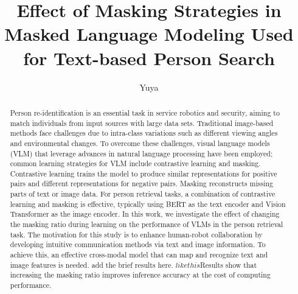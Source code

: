 \documentclass[mscthesis,english,oneside,biblatex,imlex]{template/uefcsthesis}
\title{Effect of Masking Strategies in Masked Language Modeling Used for Text-based Person Search} %
\author{Yuya}{Takagi} %
\date{\thismonth} %
\begin{document}
\maketitle

\begin{abstract}
Person re-identification is an essential task in service robotics and security, aiming to match individuals from input sources with large data sets. Traditional image-based methods face challenges due to intra-class variations such as different viewing angles and environmental changes. To overcome these challenges, visual language models (VLM) that leverage advances in natural language processing have been employed; common learning strategies for VLM include contrastive learning and masking. Contrastive learning trains the model to produce similar representations for positive pairs and different representations for negative pairs. Masking reconstructs missing parts of text or image data.
For person retrieval tasks, a combination of contrastive learning and masking is effective, typically using BERT as the text encoder and Vision Transformer as the image encoder. In this work, we investigate the effect of changing the masking ratio during learning on the performance of VLMs in the person retrieval task. The motivation for this study is to enhance human-robot collaboration by developing intuitive communication methods via text and image information. To achieve this, an effective cross-modal model that can map and recognize text and image features is needed. {\color{red} add the brief results here. \(like this\)Results show that increasing the masking ratio improves inference accuracy at the cost of computing performance.}
\end{abstract}

\frontmatter
\tableofcontents
\mainmatter
\printglossary[type=\acronymtype]


% 


% 



\appendix
% 



\printbibliography[heading=bibintoc]

\backmatter %
\end{document}

